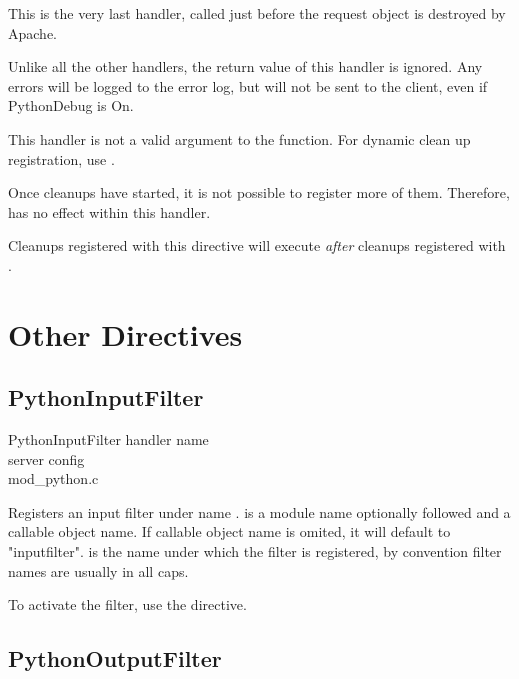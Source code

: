 This is the very last handler, called just before the request object
is destroyed by Apache.

Unlike all the other handlers, the return value of this handler is
ignored. Any errors will be logged to the error log, but will not be
sent to the client, even if PythonDebug is On.

This handler is not a valid argument to the 
function. For dynamic clean up registration, use
.

Once cleanups have started, it is not possible to register more of
them. Therefore,  has no effect within this
handler.

Cleanups registered with this directive will execute \emph{after} cleanups
registered with .

\section{Other Directives\label{dir-other}}

\subsection{PythonInputFilter\label{dir-other-if}}

PythonInputFilter handler name\\
server config\\
mod_python.c

Registers an input filter  under name
.  is a module name optionally followed
\code{::} and a callable object name. If callable object name is
omited, it will default to "inputfilter".  is the name under
which the filter is registered, by convention filter names are usually
in all caps.

To activate the filter, use the  directive.

\subsection{PythonOutputFilter\label{dir-other-if}}

